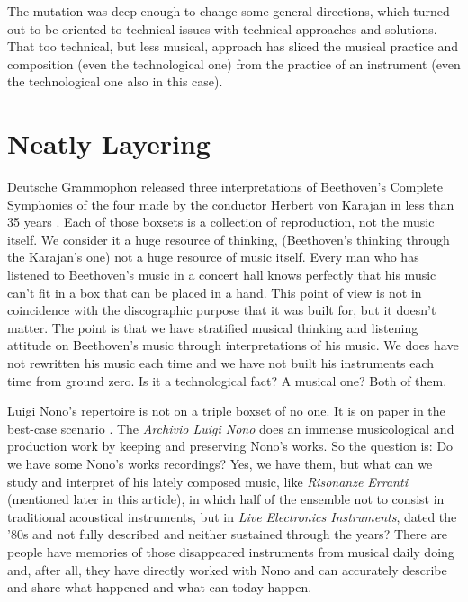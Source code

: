\documentclass[twoside,a4paper]{article}
\begin{document}
The mutation was deep enough to change some general directions, which turned out to be oriented to technical issues with technical approaches and solutions. That too technical, but less musical, approach has sliced the musical practice and composition (even the technological one) from the practice of an instrument (even the technological one also in this case). 


\section{Neatly Layering}
\label{sec:layering}

Deutsche Grammophon released three interpretations of Beethoven's Complete Symphonies of the four made by the conductor Herbert von Karajan in less than 35 years \cite{rrrnyt}. Each of those boxsets is a collection of reproduction, not the music itself. We consider it a huge resource of thinking, (Beethoven's thinking through the Karajan's one) not a huge resource of music itself. Every man who has listened to Beethoven's music in a concert hall knows perfectly that his music can't fit in a box that can be placed in a hand. This point of view is not in coincidence with the discographic purpose that it was built for, but it doesn't matter. The point is that we have stratified musical thinking and listening attitude on Beethoven's music through interpretations of his music. We does have not rewritten his music each time and we have not built his instruments each time from ground zero. Is it a technological fact? A musical one? Both of them.

Luigi Nono's repertoire is not on a triple boxset of no one. It is on paper in the best-case scenario \cite{raprmt}. The \emph{Archivio Luigi Nono} does an immense musicological and production work by keeping and preserving Nono's works. So the question is: Do we have some Nono's works recordings? Yes, we have them, but what can we study and interpret of his lately composed music, like \emph{Risonanze Erranti} (mentioned later in this article), in which half of the ensemble not to consist in traditional acoustical instruments, but in \emph{Live Electronics Instruments}, dated the '80s and not fully described and neither sustained through the years? There are people have memories of those disappeared instruments from musical daily doing and, after all, they have directly worked with Nono and can accurately describe and share what happened and what can today happen. 
\end{document}
